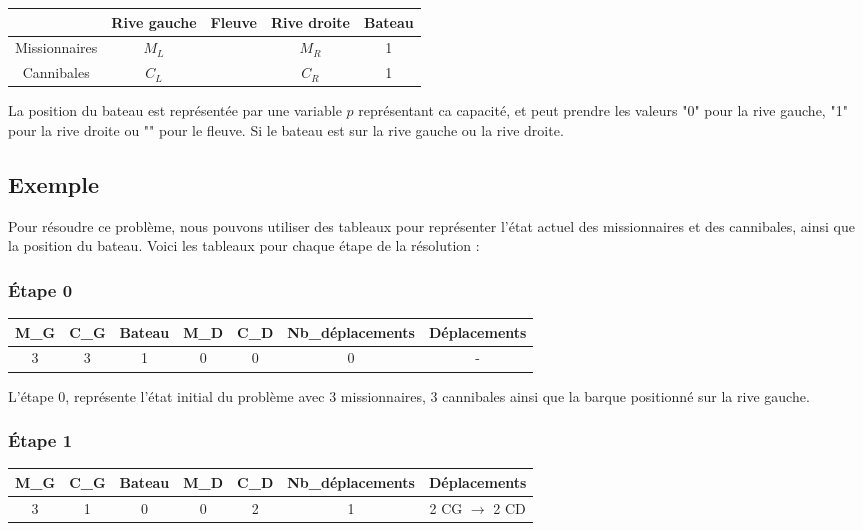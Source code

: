 \documentclass{article}
\begin{document}
\begin{center}
\begin{tabular}{|c|c|c|c|c|}
\hline
& Rive gauche & Fleuve & Rive droite & Bateau \\
\hline
Missionnaires & $M_L$ & & $M_R$ & 1 \\
\hline
Cannibales & $C_L$ & & $C_R$ & 1 \\
\hline
\end{tabular}
\end{center}

\noindent La position du bateau est représentée par une variable $p$ représentant ca capacité, et peut prendre les valeurs "0" pour la rive gauche, "1" pour la rive droite ou "" pour le fleuve. Si le bateau est sur la rive gauche ou la rive droite.

\subsection{Exemple}

Pour résoudre ce problème, nous pouvons utiliser des tableaux pour représenter l'état actuel des missionnaires et des cannibales, ainsi que la position du bateau. Voici les tableaux pour chaque étape de la résolution :

\subsubsection{Étape 0}

\begin{center}
\begin{tabular}{|c|c|c|c|c|c|c|}
\hline
\textbf{M\_G} & \textbf{C\_G} & \textbf{Bateau} & \textbf{M\_D} & \textbf{C\_D} & \textbf{Nb\_déplacements} & \textbf{Déplacements} \\
\hline
3 & 3 & 1 & 0 & 0 & 0 & - \\
\hline
\end{tabular}
\end{center}

\noindent L'étape 0, représente l'état initial du problème avec 3 missionnaires, 3 cannibales ainsi que la barque positionné sur la rive gauche.

\subsubsection{Étape 1}

\begin{center}
\begin{tabular}{|c|c|c|c|c|c|c|}
\hline
\textbf{M\_G} & \textbf{C\_G} & \textbf{Bateau} & \textbf{M\_D} & \textbf{C\_D} & \textbf{Nb\_déplacements} & \textbf{Déplacements} \\
\hline
3 & 1 & 0 & 0 & 2 & 1 & 2 CG $\rightarrow$ 2 CD \\
\hline
\end{tabular}
\end{center}
\end{document}
